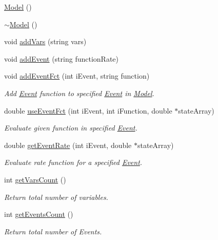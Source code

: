 \begin{DoxyCompactItemize}
\item 
\hyperlink{class_model_ae3b375de5f6df4faf74a95d64748e048}{Model} ()
\item 
\hyperlink{class_model_ad6ebd2062a0b823db841a0b88baac4c0}{$\sim$\+Model} ()
\item 
void \hyperlink{class_model_a4743b4f267eeb1a60e21cc2995e1efcd}{add\+Vars} (string vars)
\item 
void \hyperlink{class_model_ab6f784e4ff8cdf3ee5e010ef4dd8d597}{add\+Event} (string function\+Rate)
\item 
void \hyperlink{class_model_a78d9b07bd5e819215c9aeefabb4cede7}{add\+Event\+Fct} (int i\+Event, string function)
\begin{DoxyCompactList}\small\item\em Add \hyperlink{class_event}{Event} function to specified \hyperlink{class_event}{Event} in \hyperlink{class_model}{Model}. \end{DoxyCompactList}\item 
double \hyperlink{class_model_a774d9fb034f8704a75d7b3568a87a3bc}{use\+Event\+Fct} (int i\+Event, int i\+Function, double $\ast$state\+Array)
\begin{DoxyCompactList}\small\item\em Evaluate given function in specified \hyperlink{class_event}{Event}. \end{DoxyCompactList}\item 
double \hyperlink{class_model_a2909caddddccca90faaae708e68226ad}{get\+Event\+Rate} (int i\+Event, double $\ast$state\+Array)
\begin{DoxyCompactList}\small\item\em Evaluate rate function for a specified \hyperlink{class_event}{Event}. \end{DoxyCompactList}\item 
int \hyperlink{class_model_ae8b56a284c355ff18421174d078dc870}{get\+Vars\+Count} ()
\begin{DoxyCompactList}\small\item\em Return total number of variables. \end{DoxyCompactList}\item 
int \hyperlink{class_model_adc48dad5a02caa940aaffee7e8377682}{get\+Events\+Count} ()
\begin{DoxyCompactList}\small\item\em Return total number of Events. \end{DoxyCompactList}\item 

\end{DoxyCompactItemize}
